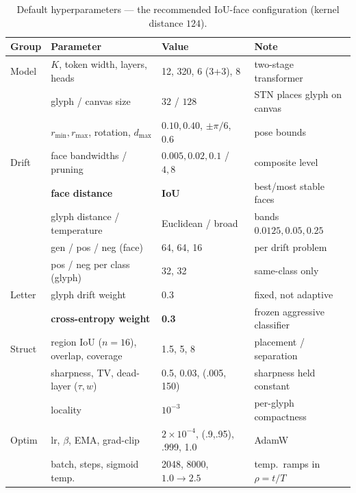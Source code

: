 \documentclass{article}
\begin{document}
\begin{table}[t]
  \caption{Default hyperparameters --- the recommended IoU-face configuration (kernel distance $124$).}
  \label{tab:hparams}
  \centering\small
  \setlength{\tabcolsep}{4.5pt}
  \begin{tabular}{llll}
    \toprule
    Group & Parameter & Value & Note \\
    \midrule
    Model & $K$, token width, layers, heads & 12, 320, 6 (3+3), 8 & two-stage transformer \\
          & glyph / canvas size & $32$ / $128$ & STN places glyph on canvas \\
          & $r_{\min},r_{\max}$, rotation, $d_{\max}$ & $0.10,0.40$, $\pm\pi/6$, $0.6$ & pose bounds \\
    Drift & face bandwidths / pruning & $0.005,0.02,0.1$ / $4,8$ & composite level \\
          & \textbf{face distance} & \textbf{IoU} & best/most stable faces \\
          & glyph distance / temperature & Euclidean / broad & bands $0.0125,0.05,0.25$ \\
          & gen / pos / neg (face) & 64, 64, 16 & per drift problem \\
          & pos / neg per class (glyph) & 32, 32 & same-class only \\
    Letter& glyph drift weight & 0.3 & fixed, not adaptive \\
          & \textbf{cross-entropy weight} & \textbf{0.3} & frozen aggressive classifier \\
    Struct& region IoU ($n{=}16$), overlap, coverage & 1.5, 5, 8 & placement / separation \\
          & sharpness, TV, dead-layer ($\tau,w$) & 0.5, 0.03, (.005, 150) & sharpness held constant \\
          & locality & $10^{-3}$ & per-glyph compactness \\
    Optim & lr, $\beta$, EMA, grad-clip & $2{\times}10^{-4}$, (.9,.95), .999, 1.0 & AdamW \\
          & batch, steps, sigmoid temp. & 2048, 8000, $1.0\to2.5$ & temp.\ ramps in $\rho{=}t/T$ \\
    \bottomrule
  \end{tabular}
\end{table}
\end{document}
